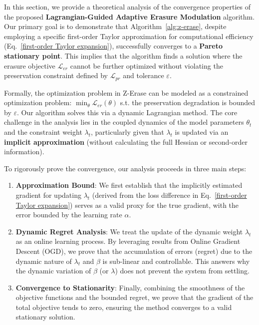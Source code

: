 In this section, we provide a theoretical analysis of the convergence properties of the proposed \textbf{Lagrangian-Guided Adaptive Erasure Modulation} algorithm. Our primary goal is to demonstrate that Algorithm~\ref{alg:z-erase}, despite employing a specific first-order Taylor approximation for computational efficiency (Eq.~\ref{first-order Taylor expansion}), successfully converges to a \textbf{Pareto stationary point}. This implies that the algorithm finds a solution where the erasure objective $\mathcal{L}_{er}$ cannot be further optimized without violating the preservation constraint defined by $\mathcal{L}_{pr}$ and tolerance $\varepsilon$.

Formally, the optimization problem in Z-Erase can be modeled as a constrained optimization problem: $\min_{\theta} \mathcal{L}_{er}(\theta)$ s.t. the preservation degradation is bounded by $\varepsilon$. Our algorithm solves this via a dynamic Lagrangian method. The core challenge in the analysis lies in the coupled dynamics of the model parameters $\theta_t$ and the constraint weight $\lambda_t$, particularly given that $\lambda_t$ is updated via an \textbf{implicit approximation} (without calculating the full Hessian or second-order information).

To rigorously prove the convergence, our analysis proceeds in three main steps:
\begin{enumerate}
    \item \textbf{Approximation Bound}: We first establish that the implicitly estimated gradient for updating $\lambda_t$ (derived from the loss difference in Eq.~\ref{first-order Taylor expansion}) serves as a valid proxy for the true gradient, with the error bounded by the learning rate $\alpha$.
    \item \textbf{Dynamic Regret Analysis}: We treat the update of the dynamic weight $\lambda_t$ as an online learning process. By leveraging results from Online Gradient Descent (OGD), we prove that the accumulation of errors (regret) due to the dynamic nature of $\lambda_t$ and $\beta$ is sub-linear and controllable. This answers why the dynamic variation of $\beta$ (or $\lambda$) does not prevent the system from settling.
    \item \textbf{Convergence to Stationarity}: Finally, combining the smoothness of the objective functions and the bounded regret, we prove that the gradient of the total objective tends to zero, ensuring the method converges to a valid stationary solution.
\end{enumerate}


